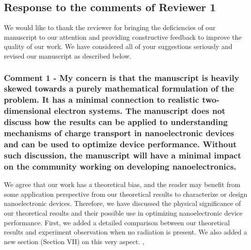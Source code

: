 \documentclass{article}
\begin{document}
\subsection*{Response to the comments of Reviewer 1}

We would like to thank the reviewer for bringing the deficiencies of our manuscript to our attention and providing constructive feedback to improve the quality of our work. We have considered all of your suggestions seriously and revised our manuscript as described below.

\subsubsection*{Comment 1 -
\color{RoyalBlue} My concern is that the manuscript is heavily skewed towards a purely mathematical formulation of the problem. It has a minimal connection to realistic two-dimensional electron systems. The manuscript does not discuss how the results can be applied to understanding mechanisms of charge transport in nanoelectronic devices and can be used to optimize device performance. Without such discussion, the manuscript will have a minimal impact on the community working on developing nanoelectronics.}

We agree that our work has a theoretical bias, and the reader may benefit from some application perspective from our theoretical results to characterize or design nanoelectronic devices. Therefore, we have discussed the physical significance of our theoretical results and their possible use in optimizing nanoelectronic device performance. First, we added a detailed comparison between our theoretical results and experiment observation when no radiation is present.  We also added a new section (Section VII) on this very aspect.
,
\end{document}
